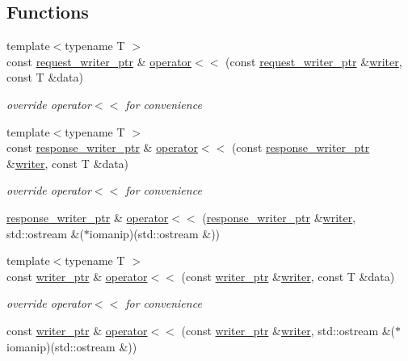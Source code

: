 \subsection*{Functions}
\begin{DoxyCompactItemize}
\item 
{\footnotesize template$<$typename T $>$ }\\const \hyperlink{namespacepion_1_1http_afe361f478f250aac9900197f37176428}{request\-\_\-writer\-\_\-ptr} \& \hyperlink{namespacepion_1_1http_a12035ebe1341e3cc9de6cbeb4966257a}{operator$<$$<$} (const \hyperlink{namespacepion_1_1http_afe361f478f250aac9900197f37176428}{request\-\_\-writer\-\_\-ptr} \&\hyperlink{classpion_1_1http_1_1writer}{writer}, const T \&data)
\begin{DoxyCompactList}\small\item\em override operator$<$$<$ for convenience \end{DoxyCompactList}\item 
{\footnotesize template$<$typename T $>$ }\\const \hyperlink{namespacepion_1_1http_aaf75f88dc37f535e5584e55450257e14}{response\-\_\-writer\-\_\-ptr} \& \hyperlink{namespacepion_1_1http_ac7d19b3180626fe21ab19eab46be37bd}{operator$<$$<$} (const \hyperlink{namespacepion_1_1http_aaf75f88dc37f535e5584e55450257e14}{response\-\_\-writer\-\_\-ptr} \&\hyperlink{classpion_1_1http_1_1writer}{writer}, const T \&data)
\begin{DoxyCompactList}\small\item\em override operator$<$$<$ for convenience \end{DoxyCompactList}\item 
\hyperlink{namespacepion_1_1http_aaf75f88dc37f535e5584e55450257e14}{response\-\_\-writer\-\_\-ptr} \& \hyperlink{namespacepion_1_1http_a7c5d092c7456e0802179ef0e4e4a598a}{operator$<$$<$} (\hyperlink{namespacepion_1_1http_aaf75f88dc37f535e5584e55450257e14}{response\-\_\-writer\-\_\-ptr} \&\hyperlink{classpion_1_1http_1_1writer}{writer}, std\-::ostream \&($\ast$iomanip)(std\-::ostream \&))
\item 
{\footnotesize template$<$typename T $>$ }\\const \hyperlink{namespacepion_1_1http_ab8e875e702aba19923014f31d69762df}{writer\-\_\-ptr} \& \hyperlink{namespacepion_1_1http_a6bc0a9d86fa7e6e096b306f2e5d3f96e}{operator$<$$<$} (const \hyperlink{namespacepion_1_1http_ab8e875e702aba19923014f31d69762df}{writer\-\_\-ptr} \&\hyperlink{classpion_1_1http_1_1writer}{writer}, const T \&data)
\begin{DoxyCompactList}\small\item\em override operator$<$$<$ for convenience \end{DoxyCompactList}\item 
const \hyperlink{namespacepion_1_1http_ab8e875e702aba19923014f31d69762df}{writer\-\_\-ptr} \& \hyperlink{namespacepion_1_1http_a3295cdc8e4104af9a1a48ef1184fcb4e}{operator$<$$<$} (const \hyperlink{namespacepion_1_1http_ab8e875e702aba19923014f31d69762df}{writer\-\_\-ptr} \&\hyperlink{classpion_1_1http_1_1writer}{writer}, std\-::ostream \&($\ast$iomanip)(std\-::ostream \&))
\end{DoxyCompactItemize}



